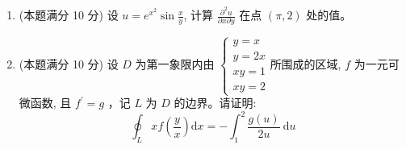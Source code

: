 \begin{enumerate}
{	\textbf{去根号.} 利用 $1+\sin\theta=\left(\cos\frac{\theta}{2}+\sin\frac{\theta}{2}\right)^2$，
	取 $\theta=\pi x$。当 $x\in[0,1]$ 时 $\frac{\pi x}{2}\in\left[0,\frac{\pi}{2}\right]$，
	正弦余弦均非负，故可直接开方：
	\[
	\sqrt{1+\sin\pi x}=\cos\frac{\pi x}{2}+\sin\frac{\pi x}{2} .
	\]

	\textbf{积分.}
	\[
	\int_0^1\left(\cos\frac{\pi x}{2}+\sin\frac{\pi x}{2}\right)dx
	=\left[\frac{2}{\pi}\sin\frac{\pi x}{2}-\frac{2}{\pi}\cos\frac{\pi x}{2}\right]_0^1
	=\frac{4}{\pi} .
	\]
	即所求极限为 $\frac{4}{\pi}\approx1.2732$（取 $n=10^5$ 的数值和为 $1.27324$，吻合）。
}


\item
(本题满分 10 分)
设 $u=e^{x^{2}} \sin \frac{x}{y}$, 计算 $\frac{\partial^{2} u}{\partial x \partial y}$ 在点 $(\pi, 2)$ 处的值。




\item
(本题满分 10 分)
设 $D$ 为第一象限内由 $\left\{\begin{array}{l}y=x \\ y=2x \\ x y=1 \\ x y=2\end{array}\right.$所围成的区域, $f$ 为一元可微函数, 且 $f^{\prime}=g$ ，记 $L$ 为 $D$ 的边界。请证明:
\[
\oint_{L} x f\left(\frac{y}{x}\right) \mathrm{d} x=-\int_{1}^{2} \frac{g(u)}{2 u} \mathrm{~d} u
\]


\end{enumerate}
